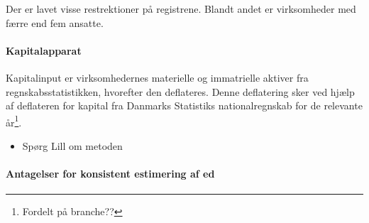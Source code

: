 Der er lavet visse restrektioner på registrene. Blandt andet er virksomheder med færre end fem ansatte. 

\paragraph{Kapitalapparat} 
Kapitalinput er virksomhedernes materielle og immatrielle aktiver fra regnskabsstatistikken, hvorefter den deflateres. Denne deflatering sker ved hjælp af deflateren for kapital fra Danmarks Statistiks nationalregnskab for de relevante år\footnote{Fordelt på branche??}.

\begin{itemize}
	\item Spørg Lill om metoden
\end{itemize}

\paragraph{Antagelser for konsistent estimering af ed}
